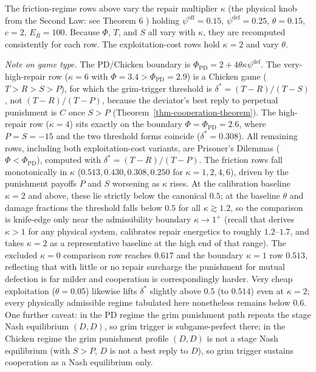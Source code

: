 \documentclass[11pt]{article}
\theoremstyle{plain}
\theoremstyle{definition}
\theoremstyle{remark}
\newenvironment{tablenote}
  {\par\addvspace{2pt}\footnotesize\noindent}
  {\par\addvspace{4pt}}
\newcounter{none}
\begin{document}
\begin{tablenote}

The friction-regime rows above vary the repair multiplier \(\kappa\)
(the physical knob from the Second Law: see Theorem 6 \citep{TC-IV})
holding \(\psi^{\text{off}} = 0.15\), \(\psi^{\text{def}} = 0.25\),
\(\theta = 0.15\), \(c = 2\), \(E_R = 100\). Because \(\Phi\), \(T\),
and \(S\) all vary with \(\kappa\), they are recomputed consistently for
each row. The exploitation-cost rows hold \(\kappa = 2\) and vary
\(\theta\).

\emph{Note on game type.} The PD/Chicken boundary is
\(\Phi_{\text{PD}} = 2 + 4\theta\kappa\psi^{\text{def}}\). The
very-high-repair row (\(\kappa = 6\) with
\(\Phi = 3.4 > \Phi_{\text{PD}} = 2.9\)) is a Chicken game
(\(T > R > S > P\)), for which the grim-trigger threshold is
\(\delta^* = (T - R)/(T - S)\), not \((T - R)/(T - P)\), because the
deviator's best reply to perpetual punishment is \(C\) once \(S > P\)
(Theorem~\ref{thm-cooperation-theorem}). The high-repair row
(\(\kappa = 4\)) sits exactly on the boundary
\(\Phi = \Phi_{\text{PD}} = 2.6\), where \(P = S = -15\) and the two
threshold forms coincide (\(\delta^* = 0.308\)). All remaining rows,
including both exploitation-cost variants, are Prisoner's Dilemmas
(\(\Phi < \Phi_{\text{PD}}\)), computed with
\(\delta^* = (T - R)/(T - P)\). The friction rows fall monotonically in
\(\kappa\) (\(0.513, 0.430, 0.308, 0.250\) for \(\kappa = 1, 2, 4, 6\)),
driven by the punishment payoffs \(P\) and \(S\) worsening as \(\kappa\)
rises. At the calibration baseline \(\kappa = 2\) and above, these lie
strictly below the canonical \(0.5\); at the baseline \(\theta\) and
damage fractions the threshold falls below \(0.5\) for all
\(\kappa \gtrsim 1.2\), so the comparison is knife-edge only near the
admissibility boundary \(\kappa \to 1^+\) (recall that \citep{TC-IV}
derives \(\kappa > 1\) for any physical system, calibrates repair
energetics to roughly \(1.2\)--\(1.7\), and takes \(\kappa = 2\) as a
representative baseline at the high end of that range). The excluded
\(\kappa = 0\) comparison row reaches \(0.617\) and the boundary
\(\kappa = 1\) row \(0.513\), reflecting that with little or no repair
surcharge the punishment for mutual defection is far milder and
cooperation is correspondingly harder. Very cheap exploitation
(\(\theta = 0.05\)) likewise lifts \(\delta^*\) slightly above \(0.5\)
(to \(0.514\)) even at \(\kappa = 2\); every physically admissible
regime tabulated here nonetheless remains below \(0.6\). One further
caveat: in the PD regime the grim punishment path repeats the stage Nash
equilibrium \((D,D)\), so grim trigger is subgame-perfect there; in the
Chicken regime the grim punishment profile \((D,D)\) is not a stage Nash
equilibrium (with \(S > P\), \(D\) is not a best reply to \(D\)), so
grim trigger sustains cooperation as a Nash equilibrium only.

\end{tablenote}
\end{document}
